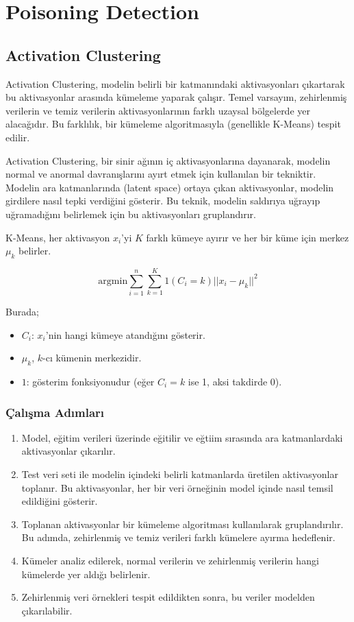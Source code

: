 \section{Poisoning Detection}

\subsection{Activation Clustering}

Activation Clustering, modelin belirli bir katmanındaki aktivasyonları çıkartarak bu aktivasyonlar arasında kümeleme yaparak çalışır. Temel varsayım, zehirlenmiş verilerin ve temiz verilerin aktivasyonlarının farklı uzaysal bölgelerde yer alacağıdır. Bu farklılık, bir kümeleme algoritmasıyla (genellikle K-Means) tespit edilir.

Activation Clustering, bir sinir ağının iç aktivasyonlarına dayanarak, modelin normal ve anormal davranışlarını ayırt etmek için kullanılan bir tekniktir. Modelin ara katmanlarında (latent space) ortaya çıkan aktivasyonlar, modelin girdilere nasıl tepki verdiğini gösterir. Bu teknik, modelin saldırıya uğrayıp uğramadığını belirlemek için bu aktivasyonları gruplandırır.

K-Means, her aktivasyon $x_i$'yi $K$ farklı kümeye ayırır ve her bir küme için merkez $\mu_k$ belirler. 

\[ \text{arg} \text{min} \sum_{i=1}^{n} \sum_{k=1}^{K} 1 (C_i = k) |\!| x_i - \mu_{k} |\!|^2 \]

Burada;

\begin{itemize}
    \item $C_i$: $x_i$'nin hangi kümeye atandığını gösterir.
    \item $\mu_{k}$, $k$-cı kümenin merkezidir.
    \item $1$: gösterim fonksiyonudur (eğer $C_i = k$ ise 1, aksi takdirde 0).
\end{itemize}

\subsubsection{Çalışma Adımları}

\begin{enumerate}
    \item Model, eğitim verileri üzerinde eğitilir ve eğtiim sırasında ara katmanlardaki aktivasyonlar çıkarılır.
    \item Test veri seti ile modelin içindeki belirli katmanlarda üretilen aktivasyonlar toplanır. Bu aktivasyonlar, her bir veri örneğinin model içinde nasıl temsil edildiğini gösterir.
    \item Toplanan aktivasyonlar bir kümeleme algoritması kullanılarak gruplandırılır. Bu adımda, zehirlenmiş ve temiz verileri farklı kümelere ayırma hedeflenir.
    \item Kümeler analiz edilerek, normal verilerin ve zehirlenmiş verilerin hangi kümelerde yer aldığı belirlenir.
    \item Zehirlenmiş veri örnekleri tespit edildikten sonra, bu veriler modelden çıkarılabilir.
\end{enumerate}

